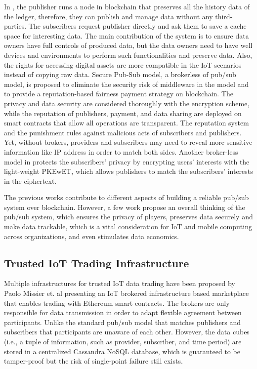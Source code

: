 \documentclass[conference]{IEEEtran}
\begin{document}
In \cite{userCentricData}, the publisher runs a node in blockchain that preserves all the history data of the ledger, therefore, they can publish and manage data without any third-parties. The subscribers request publisher directly and ask them to save a cache space for interesting data. The main contribution of the system is to ensure data owners have full controls of produced data, but the data owners need to have well devices and environments to perform such functionalities and preserve data. Also, the rights for accessing digital assets are more compatible in the IoT scenarios instead of copying raw data. Secure Pub-Sub model\cite{SPS}, a brokerless of pub/sub model, is proposed to eliminate the security risk of middleware in the model and to provide a reputation-based fairness payment strategy on blockchain. The privacy and data security are considered thoroughly with the encryption scheme, while the reputation of publishers, payment, and data sharing are deployed on smart contracts that allow all operations are transparent. The reputation system and the punishment rules against malicious acts of subscribers and publishers. Yet, without brokers, providers and subscribers may need to reveal more sensitive information like IP address in order to match both sides. Another broker-less model in \cite{PrivacyPreservPubSub} protects the subscribers' privacy by encrypting users' interests with the light-weight PKEwET\cite{PKEwET}, which allows publishers to match the subscribers' interests in the ciphertext.

The previous works contribute to different aspects of building a reliable pub/sub system over blockchain. However, a few work propose an overall thinking of the pub/sub system, which ensures the privacy of players, preserves data securely and make data trackable, which is a vital consideration for IoT and mobile computing across organizations, and even stimulates data economics.

\subsection{Trusted IoT Trading Infrastructure}
Multiple infrastructures for trusted IoT data trading have been proposed by Paolo Missier et. al\cite{MindMyValue} presenting an IoT brokered infrastructure based marketplace that enables trading with Ethereum smart contracts. The brokers are only responsible for data transmission in order to adapt flexible agreement between participants. Unlike the standard pub/sub model that matches publishers and subscribers that participants are unaware of each other. However, the data cubes (i.e., a tuple of information, such as provider, subscriber, and time period) are stored in a centralized Cassandra NoSQL database, which is guaranteed to be tamper-proof but the risk of single-point failure still exists.
\end{document}
